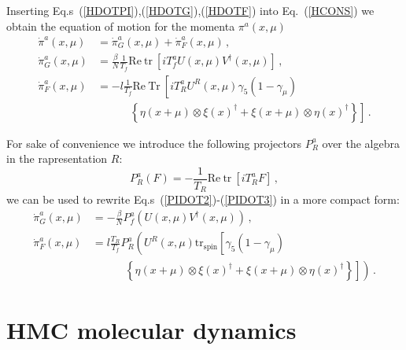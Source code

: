 \documentclass{article}[12pt]
\begin{document}
Inserting Eq.s~(\ref{HDOTPI}),(\ref{HDOTG}),(\ref{HDOTF}) into Eq.~(\ref{HCONS}) we obtain the equation of motion
for the momenta $\pi^a(x,\mu)$
\begin{align}
\dot\pi^a(x,\mu) &= \dot\pi^a_G(x,\mu) + \dot\pi^a_F(x,\mu) \, , \label{PIDOT1}\\
\dot\pi^a_G(x,\mu) &= \frac{\beta}{N} \frac{1}{T_f} \mathrm{Re\ tr\ } \left[ i T^a_f U(x,\mu) V^\dagger(x,\mu) \right] \, ,\label{PIDOT2}\\
\dot\pi^a_F(x,\mu) &=- l \frac{1}{T_f} \mathrm{Re\ Tr\ } \left[ iT^a_R U^R(x,\mu) \gamma_5 (1-\gamma_\mu) \right. \nonumber\\
										&\quad\quad\quad	\left. \left\{ \eta(x+\mu)\otimes\xi(x)^\dagger + \xi(x+\mu)\otimes\eta(x)^\dagger \right\} \right]\, . \label{PIDOT3}
\end{align}

For sake of convenience we introduce the following projectors $P^a_R$ over the algebra in the rapresentation $R$:
\begin{equation}
P^a_R ( F ) = - \frac{1}{T_R} \mathrm{Re\ tr\ } \left[ i T^a_R F \right] \, ,
\end{equation}
we can be used to rewrite Eq.s~(\ref{PIDOT2})-(\ref{PIDOT3}) in a more compact form:
\begin{align}
\dot\pi^a_G(x,\mu) &= - \frac{\beta}{N} P^a_f \left( U(x,\mu) V^\dagger(x,\mu) \right) \, ,\\
\dot\pi^a_F(x,\mu) &= l \frac{T_R}{T_f} P^a_R \left( U^R(x,\mu) \mathrm{tr_{spin}} \left[ \gamma_5 (1-\gamma_\mu) \right. \right. \nonumber\\
										&\quad\quad\quad	\left. \left. \left\{ \eta(x+\mu)\otimes\xi(x)^\dagger + \xi(x+\mu)\otimes\eta(x)^\dagger \right\} \right] \right)\, . \label{HFFORCE}
\end{align}



\section{HMC molecular dynamics}
\end{document}
